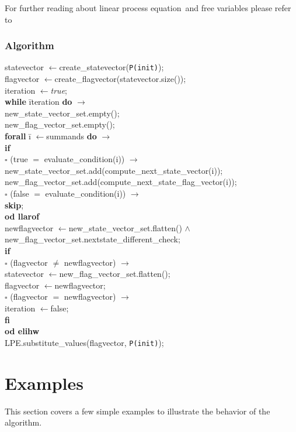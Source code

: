\documentclass[a4paper,10pt]{article}
\newcommand{\lpe}{linear process equation}
\newcommand{\ti}{\textit}
\newcommand{\tb}{\textbf}
\newcommand{\la}{$\leftarrow$}
\newcommand{\ra}{$\rightarrow$}
\newcommand{\sq}{$\square$}
\newcommand{\csvs}{new\_state\_vector\_set}
\newcommand{\cfvs}{new\_flag\_vector\_set}
\begin{document}
For further reading about \lpe\ and free variables please refer to \cite{LPEfreevar} 

\subsubsection{Algorithm} \label{sss:alg}
\begin{tabbing} 
statevector \la create\_statevector(\verb"P(init)"); \\
flagvector \la create\_flagvector(statevector.size()); \\
iteration \la \ti{true}; \\
\tb{while} \= iteration \tb{do} \ra \\
  \> \csvs .empty(); \\
  \> \cfvs .empty(); \\
  \> \tb{forall} \= i \la summands \tb{do} \ra \\
  \>  \>   \tb{if} \= \\
  \>  \>   \sq \> (true $=$ evaluate\_condition(i)) \ra \\
  \>  \>       \> \csvs .add(compute\_next\_state\_vector(i)); \\
  \>  \>       \> \cfvs .add(compute\_next\_state\_flag\_vector(i)); \\
  \>  \>  \sq \>  (false $=$ evaluate\_condition(i)) \ra \\
  \>  \>  \> \tb{skip};\\
  \>  \tb{od llarof} \\
  \>  newflagvector \la \csvs .flatten() $\wedge$  \\
  \>  \> \cfvs .nextstate\_different\_check;\\
  \>  \tb{if}  \\
  \>  \sq  \> (flagvector $\neq$ newflagvector) \ra \\ 
  \>       \>	statevector \la \cfvs .flatten(); \\
  \>       \>     flagvector \la newflagvector; \\
  \>  \sq \>  (flagvector $=$ newflagvector) \ra  \\
  \>      \> iteration \la false;\\
  \>  \tb{fi} \\
  \tb{od elihw}\\
  LPE.substitute\_values(flagvector, \verb"P(init)");
\end{tabbing}

\section{Examples}
This section covers a few simple examples to illustrate the behavior of the algorithm. 
\end{document}
